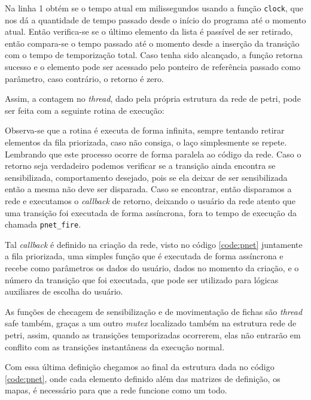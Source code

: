 Na linha 1 obtém se o tempo atual em milissegundos usando a função \lstinline{clock}, que nos dá a quantidade de tempo passado desde o início do programa até o momento atual. Então verifica-se se o último elemento da lista é passível de ser retirado, então compara-se o tempo passado até o momento desde a inserção da transição com o tempo de temporização total. Caso tenha sido alcançado, a função retorna sucesso e o elemento pode ser acessado pelo ponteiro de referência passado como parâmetro, caso contrário, o retorno é zero.

Assim, a contagem no \textit{thread}, dado pela própria estrutura da rede de petri, pode ser feita com a seguinte rotina de execução:



Observa-se que a rotina é executa de forma infinita, sempre tentando retirar elementos da fila priorizada, caso não consiga, o laço simplesmente se repete. Lembrando que este processo ocorre de forma paralela ao código da rede. Caso o retorno seja verdadeiro podemos verificar se a transição ainda encontra se sensibilizada, comportamento desejado, pois se ela deixar de ser sensibilizada então a mesma não deve ser disparada. Caso se encontrar, então disparamos a rede e executamos o \textit{callback} de retorno, deixando o usuário da rede atento que uma transição foi executada de forma assíncrona, fora to tempo de execução da chamada \lstinline{pnet_fire}. 

Tal \textit{callback} é definido na criação da rede, visto no código \ref{code:pnet} juntamente a fila priorizada, uma simples função que é executada de forma assíncrona e recebe como parâmetros os dados do usuário, dados no momento da criação, e o número da transição que foi executada, que pode ser utilizado para lógicas auxiliares de escolha do usuário.

As funções de checagem de sensibilização e de movimentação de fichas são \textit{thread} safe também, graças a um outro \textit{mutex} localizado também na estrutura rede de petri, assim, quando as transições temporizadas ocorrerem, elas não entrarão em conflito com as transições instantâneas da execução normal. 

Com essa última definição chegamos ao final da estrutura dada no código \ref{code:pnet}, onde cada elemento definido além das matrizes de definição, os mapas, é necessário para que a rede funcione como um todo.

